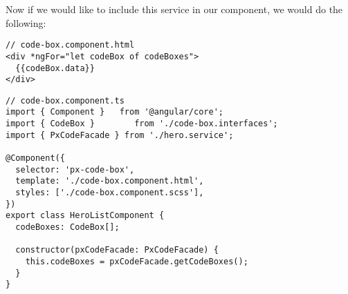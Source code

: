 
Now if we would like to include this service in our component, we would do the
following:
\begin{lstlisting}
// code-box.component.html
<div *ngFor="let codeBox of codeBoxes">
  {{codeBox.data}}
</div>
\end{lstlisting}

\begin{lstlisting}
// code-box.component.ts
import { Component }   from '@angular/core';
import { CodeBox }        from './code-box.interfaces';
import { PxCodeFacade } from './hero.service';

@Component({
  selector: 'px-code-box',
  template: './code-box.component.html',
  styles: ['./code-box.component.scss'],
})
export class HeroListComponent {
  codeBoxes: CodeBox[];

  constructor(pxCodeFacade: PxCodeFacade) {
    this.codeBoxes = pxCodeFacade.getCodeBoxes();
  }
}
\end{lstlisting}
